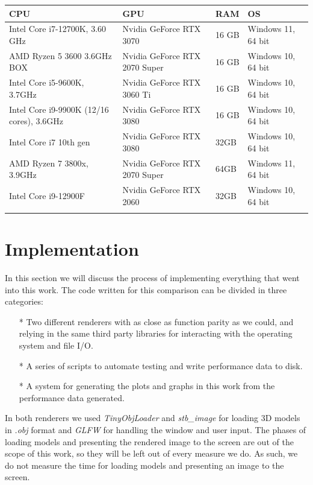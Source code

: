 \begin{center}
  \begin{tabular}{ | m{5cm} | m{3.5cm}| m{2cm}|m{4cm} |}
  \hline
  CPU& GPU& RAM& OS\\
  \hline
    Intel Core i7-12700K, 3.60 GHz& Nvidia GeForce RTX 3070& 16 GB& Windows 11, 64 bit\\ %
  \hline
    AMD Ryzen 5 3600 3.6GHz BOX& Nvidia GeForce RTX 2070 Super& 16 GB& Windows 10, 64 bit\\ %
  \hline
    Intel Core i5-9600K, 3.7GHz& Nvidia GeForce RTX 3060 Ti& 16 GB& Windows 10, 64 bit\\ %
  \hline
    Intel Core i9-9900K (12/16 cores), 3.6GHz& Nvidia GeForce RTX 3080& 16 GB& Windows 10, 64 bit\\ %
  \hline
    Intel Core i7 10th gen& Nvidia GeForce RTX 3080& 32GB& Windows 10, 64 bit\\ %
  \hline
    AMD Ryzen 7 3800x, 3.9GHz& Nvidia GeForce RTX 2070 Super& 64GB& Windows 11, 64 bit\\ %
  \hline
    Intel Core i9-12900F& Nvidia GeForce RTX 2060& 32GB& Windows 10, 64 bit\\ %
  \label{pc-specs-table}
\end{tabular}
\end{center}


\clearpage
\section{Implementation}
In this section we will discuss the process of implementing everything that went into this work. The code written for this comparison can be divided in three categories:

\begin{itemize}
    \item[*]{Two different renderers with as close as function parity as we could, and relying in the same third party libraries for interacting with the operating system and file I/O.}
    \item[*]{A series of scripts to automate testing and write performance data to disk.}
    \item[*]{A system for generating the plots and graphs in this work from the performance data generated.}
\end{itemize}

In both renderers we used \textit{TinyObjLoader} and \textit{stb\_image} for loading 3D models in \textit{.obj} format and \textit{GLFW} for handling the window and user input. The phases of loading models and presenting the rendered image to the screen are out of the scope of this work, so they will be left out of every measure we do. As such, we do not measure the time for loading models and presenting an image to the screen.

